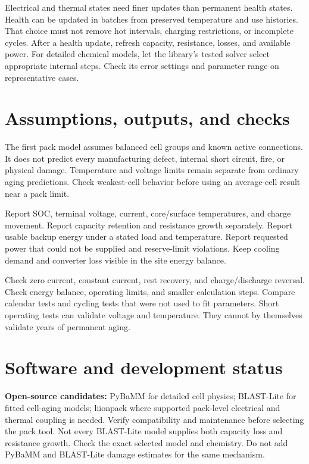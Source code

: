 \documentclass[11pt,a4paper]{report}
\begin{document}
Electrical and thermal states need finer updates than permanent health states.
Health can be updated in batches from preserved temperature and use histories.
That choice must not remove hot intervals, charging restrictions, or incomplete cycles.
After a health update, refresh capacity, resistance, losses, and available power.
For detailed chemical models, let the library's tested solver select appropriate internal steps.
Check its error settings and parameter range on representative cases.

\section{Assumptions, outputs, and checks}
The first pack model assumes balanced cell groups and known active connections.
It does not predict every manufacturing defect, internal short circuit, fire, or physical damage.
Temperature and voltage limits remain separate from ordinary aging predictions.
Check weakest-cell behavior before using an average-cell result near a pack limit.

Report SOC, terminal voltage, current, core/surface temperatures, and charge movement.
Report capacity retention and resistance growth separately.
Report usable backup energy under a stated load and temperature.
Report requested power that could not be supplied and reserve-limit violations.
Keep cooling demand and converter loss visible in the site energy balance.

Check zero current, constant current, rest recovery, and charge/discharge reversal.
Check energy balance, operating limits, and smaller calculation steps.
Compare calendar tests and cycling tests that were not used to fit parameters.
Short operating tests can validate voltage and temperature.
They cannot by themselves validate years of permanent aging.

\section{Software and development status}
\textbf{Open-source candidates:} PyBaMM for detailed cell physics;
BLAST-Lite for fitted cell-aging models;
liionpack where supported pack-level electrical and thermal coupling is needed.
Verify compatibility and maintenance before selecting the pack tool.
Not every BLAST-Lite model supplies both capacity loss and resistance growth.
Check the exact selected model and chemistry.
Do not add PyBaMM and BLAST-Lite damage estimates for the same mechanism.
\end{document}
